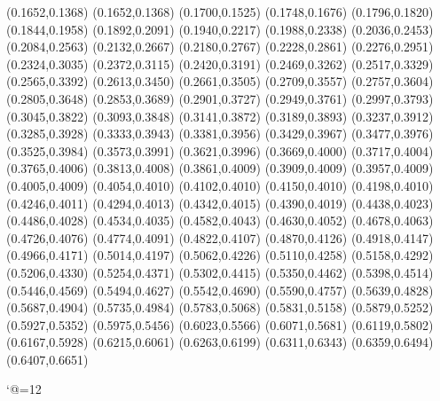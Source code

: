 \PST@Solid(0.1652,0.1368)
(0.1652,0.1368)
(0.1700,0.1525)
(0.1748,0.1676)
(0.1796,0.1820)
(0.1844,0.1958)
(0.1892,0.2091)
(0.1940,0.2217)
(0.1988,0.2338)
(0.2036,0.2453)
(0.2084,0.2563)
(0.2132,0.2667)
(0.2180,0.2767)
(0.2228,0.2861)
(0.2276,0.2951)
(0.2324,0.3035)
(0.2372,0.3115)
(0.2420,0.3191)
(0.2469,0.3262)
(0.2517,0.3329)
(0.2565,0.3392)
(0.2613,0.3450)
(0.2661,0.3505)
(0.2709,0.3557)
(0.2757,0.3604)
(0.2805,0.3648)
(0.2853,0.3689)
(0.2901,0.3727)
(0.2949,0.3761)
(0.2997,0.3793)
(0.3045,0.3822)
(0.3093,0.3848)
(0.3141,0.3872)
(0.3189,0.3893)
(0.3237,0.3912)
(0.3285,0.3928)
(0.3333,0.3943)
(0.3381,0.3956)
(0.3429,0.3967)
(0.3477,0.3976)
(0.3525,0.3984)
(0.3573,0.3991)
(0.3621,0.3996)
(0.3669,0.4000)
(0.3717,0.4004)
(0.3765,0.4006)
(0.3813,0.4008)
(0.3861,0.4009)
(0.3909,0.4009)
(0.3957,0.4009)
(0.4005,0.4009)
(0.4054,0.4010)
(0.4102,0.4010)
(0.4150,0.4010)
(0.4198,0.4010)
(0.4246,0.4011)
(0.4294,0.4013)
(0.4342,0.4015)
(0.4390,0.4019)
(0.4438,0.4023)
(0.4486,0.4028)
(0.4534,0.4035)
(0.4582,0.4043)
(0.4630,0.4052)
(0.4678,0.4063)
(0.4726,0.4076)
(0.4774,0.4091)
(0.4822,0.4107)
(0.4870,0.4126)
(0.4918,0.4147)
(0.4966,0.4171)
(0.5014,0.4197)
(0.5062,0.4226)
(0.5110,0.4258)
(0.5158,0.4292)
(0.5206,0.4330)
(0.5254,0.4371)
(0.5302,0.4415)
(0.5350,0.4462)
(0.5398,0.4514)
(0.5446,0.4569)
(0.5494,0.4627)
(0.5542,0.4690)
(0.5590,0.4757)
(0.5639,0.4828)
(0.5687,0.4904)
(0.5735,0.4984)
(0.5783,0.5068)
(0.5831,0.5158)
(0.5879,0.5252)
(0.5927,0.5352)
(0.5975,0.5456)
(0.6023,0.5566)
(0.6071,0.5681)
(0.6119,0.5802)
(0.6167,0.5928)
(0.6215,0.6061)
(0.6263,0.6199)
(0.6311,0.6343)
(0.6359,0.6494)
(0.6407,0.6651)

\catcode`@=12
\fi
\endpspicture
